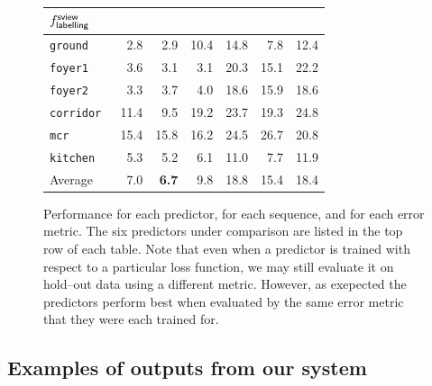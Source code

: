 \begin{figure}[h]
{\begin{tabular}{@{}p{20mm}rrrrrr@{}}
      \hspace{3mm} $f^{\textsf{sview}}_{\textsf{labelling}}$ &
      \hspace{6mm} \cite{Flint10eccv} \\
    \midrule
      \tt{ground}     &   2.8 &   2.9 &  10.4 &  14.8 &   7.8 &  12.4 \\
      \tt{foyer1}     &   3.6 &   3.1 &   3.1 &  20.3 &  15.1 &  22.2 \\
      \tt{foyer2}     &   3.3 &   3.7 &   4.0 &  18.6 &  15.9 &  18.6 \\
      \tt{corridor}   &  11.4 &   9.5 &  19.2 &  23.7 &  19.3 &  24.8 \\
      \tt{mcr}        &  15.4 &  15.8 &  16.2 &  24.5 &  26.7 &  20.8 \\
      \tt{kitchen}    &   5.3 &   5.2 &   6.1 &  11.0 &   7.7 &  11.9 \\
    \midrule
      Average         &   7.0 &   \textbf{6.7} &   9.8 &  18.8 &  15.4 &  18.4 \\
    \bottomrule
  \end{tabular}
}

\caption{Performance for each predictor, for each sequence, and for
  each error metric. The six predictors under comparison are listed in
  the top row of each table. Note that even when a predictor is
  trained with respect to a particular loss function, we may still
  evaluate it on hold--out data using a different metric. However, as
  exepected the predictors perform best when evaluated by the same
  error metric that they were each trained for.}
  \label{fig:performance}
\end{figure}


\subsection{Examples of outputs from our system}

\newcommand{\CompFrame}[3]{
  \texttt{[image: figures\_addendum/examples/\#1\_frame\#2\_\#3.jpg]}
}

\newcommand{\MviewRow}[2]{
  \CompFrame{#1}{#2}{mview_depth} &
  \CompFrame{#1}{#2}{mview_lbl} &
  \CompFrame{#1}{#2}{iccv} &
  \CompFrame{#1}{#2}{gt}
}

\newcommand{\SviewRow}[2]{
  \CompFrame{#1}{#2}{sview_depth} &
  \CompFrame{#1}{#2}{sview_lbl} &
  \CompFrame{#1}{#2}{eccv} &
  \CompFrame{#1}{#2}{gt}
}

